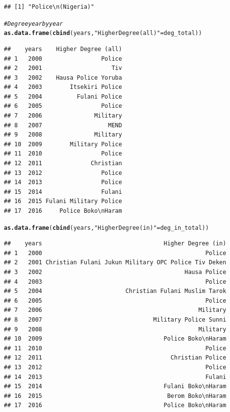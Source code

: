 \documentclass[12pt, letterpaper, notitlepage, onecolumn, twoside, openbib]{article}\usepackage[]{graphicx}\usepackage[]{color}
\makeatletter
\newcommand{\hlstr}[1]{\textcolor[rgb]{0.192,0.494,0.8}{#1}}%
\newcommand{\hlcom}[1]{\textcolor[rgb]{0.678,0.584,0.686}{\textit{#1}}}%
\newcommand{\hlstd}[1]{\textcolor[rgb]{0.345,0.345,0.345}{#1}}%
\newcommand{\hlkwd}[1]{\textcolor[rgb]{0.737,0.353,0.396}{\textbf{#1}}}%
\newenvironment{kframe}{%
 \def\at@end@of@kframe{}%
 \ifinner\ifhmode%
  \def\at@end@of@kframe{\end{minipage}}%
  \begin{minipage}{\columnwidth}%
 \fi\fi%
 \def\FrameCommand##1{\hskip\@totalleftmargin \hskip-\fboxsep
 \colorbox{shadecolor}{##1}\hskip-\fboxsep
     \hskip-\linewidth \hskip-\@totalleftmargin \hskip\columnwidth}%
 \MakeFramed {\advance\hsize-\width
   \@totalleftmargin\z@ \linewidth\hsize
   \@setminipage}}%
 {\par\unskip\endMakeFramed%
 \at@end@of@kframe}
\newenvironment{knitrout}{}{} %
\makeatother
\begin{document}
\begin{knitrout}
\begin{kframe}
\begin{alltt}
\end{alltt}
\begin{verbatim}
## [1] "Police\n(Nigeria)"
\end{verbatim}
\begin{alltt}
\hlcom{#Degree year by year}
\hlkwd{as.data.frame}\hlstd{(}\hlkwd{cbind}\hlstd{(years,} \hlstr{"Higher Degree (all)"}\hlstd{=deg_total))}
\end{alltt}
\begin{verbatim}
##    years    Higher Degree (all)
## 1   2000                 Police
## 2   2001                    Tiv
## 3   2002    Hausa Police Yoruba
## 4   2003        Itsekiri Police
## 5   2004          Fulani Police
## 6   2005                 Police
## 7   2006               Military
## 8   2007                   MEND
## 9   2008               Military
## 10  2009        Military Police
## 11  2010                 Police
## 12  2011              Christian
## 13  2012                 Police
## 14  2013                 Police
## 15  2014                 Fulani
## 16  2015 Fulani Military Police
## 17  2016     Police Boko\nHaram
\end{verbatim}
\begin{alltt}
\hlkwd{as.data.frame}\hlstd{(}\hlkwd{cbind}\hlstd{(years,} \hlstr{"Higher Degree (in)"}\hlstd{=deg_in_total))}
\end{alltt}
\begin{verbatim}
##    years                                   Higher Degree (in)
## 1   2000                                               Police
## 2   2001 Christian Fulani Jukun Military OPC Police Tiv Deken
## 3   2002                                         Hausa Police
## 4   2003                                               Police
## 5   2004                        Christian Fulani Muslim Tarok
## 6   2005                                               Police
## 7   2006                                             Military
## 8   2007                                Military Police Sunni
## 9   2008                                             Military
## 10  2009                                   Police Boko\nHaram
## 11  2010                                               Police
## 12  2011                                     Christian Police
## 13  2012                                               Police
## 14  2013                                               Fulani
## 15  2014                                   Fulani Boko\nHaram
## 16  2015                                    Berom Boko\nHaram
## 17  2016                                   Police Boko\nHaram

\end{verbatim}
\end{kframe}
\end{knitrout}
\end{document}
